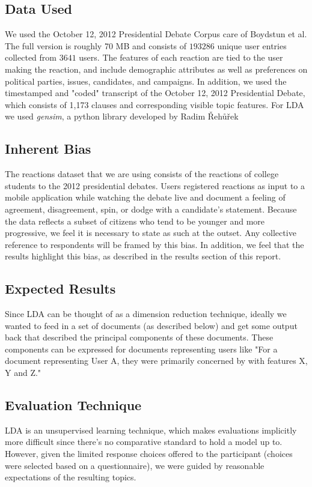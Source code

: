 \subsection{Data Used}
We used the October 12, 2012  Presidential Debate Corpus care of Boydstun et al. The full version is roughly 70 MB and consists of  $193286$ unique user entries collected from $3641$ users.  The features of each reaction are tied to the user making the reaction, and include demographic attributes as well as preferences on political parties, issues, candidates, and campaigns.  In addition, we used the timestamped and "coded" transcript of the October 12, 2012 Presidential Debate, which consists of 1,173 clauses and corresponding visible topic features.
For LDA we used \emph{gensim}, a python library developed by Radim Řehůřek \cite{gensim}

\subsection{Inherent Bias}
The reactions dataset that we are using consists of the reactions of college students to the 2012 presidential debates. Users registered reactions as input to a mobile application while watching the debate live and document a feeling of agreement, disagreement, spin, or dodge with a candidate's statement.  Because the data reflects a subset of citizens who tend to be younger and more progressive, we feel it is necessary to state as such at the outset. Any collective reference to respondents will be framed by this bias. In addition, we feel that the results highlight this bias, as described in the results section of this report.

\subsection{Expected Results}
Since LDA can be thought of as a dimension reduction technique, ideally we wanted to feed in a set of documents (as described below) and get some output back that described the principal components of these documents. These components can be expressed for documents representing users like "For a document representing User A, they were primarily concerned by with features X, Y and Z."

\subsection{Evaluation Technique}
LDA is an unsupervised learning technique, which makes evaluations implicitly more difficult since there's no comparative standard to hold a model up to.  However, given the limited response choices offered to the participant (choices were selected based on a questionnaire), we were guided by reasonable expectations of the resulting topics.

